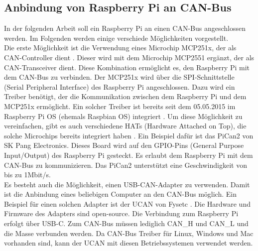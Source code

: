 \subsection{Anbindung von Raspberry Pi an CAN-Bus} \label{sec:raspberryPiToCAN}	
In der folgenden Arbeit soll ein Raspberry Pi an einen CAN-Bus angeschlossen werden. 
Im Folgenden werden einige verschiede Möglichkeiten vorgestellt.\\
Die erste Möglichkeit ist die Verwendung eines Microchip MCP251x, der als CAN-Controller dient \cite{Salunkhe2016}. Dieser wird 
mit dem Microchip MCP2551 ergänzt, der als CAN-Transceiver dient. Diese Kombination ermöglicht es, den
Raspberry Pi mit dem CAN-Bus zu verbinden. Der MCP251x wird über die SPI-Schnittstelle (Serial Peripheral Interface) 
des Raspberry Pi angeschlossen. Dazu wird ein Treiber benötigt, der die Kommunikation zwischen dem Raspberry Pi und dem
MCP251x ermöglicht. Ein solcher Treiber ist bereits seit dem 05.05.2015 im Raspberry Pi OS (ehemals Raspbian OS)
integriert \cite{Salunkhe2016}. 
Um diese Möglichkeit zu vereinfachen, gibt es auch verschiedene HATs (Hardware Attached on Top), die solche Microchips
bereits integriert haben \cite{Pant2019}. Ein Beispiel dafür ist das PiCan2 von SK Pang Electronics. Dieses Board wird auf den 
GPIO-Pins (General Purpose Input/Output) des Raspberry Pi gesteckt. Es erlaubt dem Raspberry Pi mit dem CAN-Bus
zu kommunizieren. Das PiCan2 unterstützt eine Geschwindigkeit von bis zu 1Mbit/s. \\
Es besteht auch die Möglichkeit, einen USB-CAN-Adapter zu verwenden. Damit ist die Anbindung eines 
beliebigen Computer an den CAN-Bus möglich.
Ein Beispiel für einen solchen Adapter ist der UCAN von Fysetc \cite{FysetcUCAN}. 
Die Hardware und Firmware des Adapters
sind open-source. Die Verbindung zum Raspberry Pi erfolgt über USB-C.
Zum CAN-Bus müssen lediglich CAN\_H und CAN\_L und die Masse verbunden werden. Da CAN-Bus Treiber für Linux, Windows und Mac
vorhanden sind, kann der UCAN mit diesen Betriebssystemen verwendet werden. 



